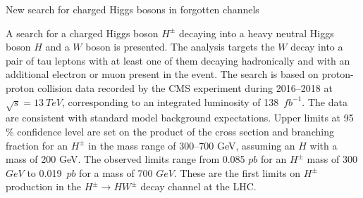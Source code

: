 \begin{MyArticle}[enhanced, tikz={rotate=0}, width=0.25\textwidth]{New
    search for charged Higgs bosons in forgotten channels}
  \begin{multicols}{2}
  A search for a charged Higgs boson $H^{\pm}$ decaying
  into a heavy neutral Higgs boson $H$ and a $W$ boson
  is presented. The analysis targets the $W$ decay into a pair
  of tau leptons with at least one of them decaying hadronically and
  with an additional electron or muon present in the event.
  The search is based on proton-proton collision data
  recorded by the CMS experiment during 2016--2018 at
  $\sqrt{s} = 13~TeV$, corresponding to an integrated
  luminosity of 138~$fb^{-1}$. The data are consistent with
  standard model background expectations. Upper limits at 95$\%$ confidence
  level are set on the product of the cross section and branching fraction
  for an $H^{\pm}$ in the mass range of 300--700 GeV, assuming an $H$ 
  with a mass of 200 GeV. The observed limits range from
  0.085 $pb$ for an $H^{\pm}$ mass of
  300 $GeV$ to 0.019~$pb$ for a mass of
  700 $GeV$. These are the first limits on $H^{\pm}$
  production in the $H^{\pm} \to H W^{\pm}$ decay channel at the LHC. 
  \end{multicols}
\end{MyArticle}
